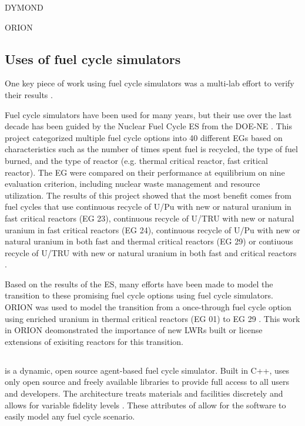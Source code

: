 DYMOND 

ORION 

\subsection{Uses of fuel cycle simulators}
One key piece of work using fuel cycle simulators was a multi-lab effort 
to verify their results \cite{feng_standardized_2016}.

Fuel cycle simulators have been used for many years, but their use over the 
last decade has been guided by the Nuclear Fuel Cycle \gls{ES} from the \gls{DOE-NE} 
\cite{wigeland_nuclear_2014}. This project categorized 
multiple fuel cycle options into 40 different \glspl{EG} based on characteristics 
such as the number of times spent fuel is recycled, the type of fuel burned, 
and the type of reactor (e.g. thermal critical reactor, fast critical reactor). 
The \gls{EG} were compared on their performance at equilibrium on nine evaluation 
criterion, including nuclear waste management and resource utilization. The 
results of this project showed that the most benefit comes from fuel cycles 
that use continuous recycle of U/Pu with new or natural uranium in fast critical 
reactors (\gls{EG} 23), continuous recycle of U/TRU with new or natural 
uranium in fast critical reactors (\gls{EG} 24), continuous recycle of U/Pu 
with new or natural uranium in both fast and thermal critical reactors 
(\gls{EG} 29) or contiuous recycle of U/TRU with new or natural uranium in 
both fast and critical reactors \cite{wigeland_nuclear_2014}. 

Based on the results of the \gls{ES}, many efforts have been made to model 
the transition to these promising fuel cycle options using fuel cycle 
simulators. ORION was used to model the transition from a once-through 
fuel cycle option using enriched uranium in thermal critical reactors (\gls{EG}
01) to \gls{EG} 29 \cite{sunny_transition_2015}. This work in ORION 
deomonstrated the importance of new \glspl{LWR} built or license extensions of 
exisiting reactors for this transition. 


\subsection{\Cyclus}
\Cyclus is a dynamic, open source agent-based fuel cycle simulator. Built 
in C++, \Cyclus uses only open source and freely available libraries to 
provide full access to all users and developers. The 
\Cyclus architecture treats materials and facilities discretely and allows 
for variable fidelity levels \cite{huff_fundamental_2016}. These attributes
of \Cyclus allow for the software to easily model any fuel cycle scenario.

